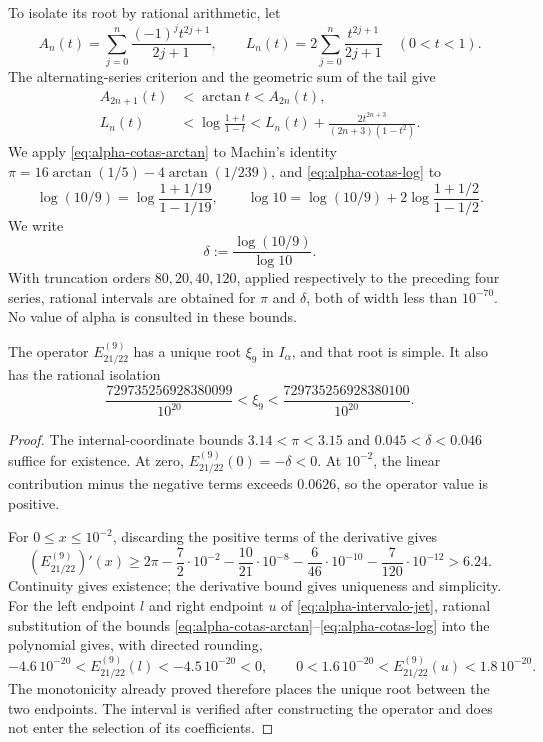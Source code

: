 To isolate its root by rational arithmetic, let
\[
 A_n(t)=\sum_{j=0}^{n}\frac{(-1)^jt^{2j+1}}{2j+1},\qquad
 L_n(t)=2\sum_{j=0}^{n}\frac{t^{2j+1}}{2j+1}\quad(0<t<1).
\]
The alternating-series criterion and the geometric sum of the tail give
\begin{align}
 A_{2n+1}(t)&<\arctan t<A_{2n}(t),
 \label{eq:alpha-cotas-arctan}\\
 L_n(t)&<\log\frac{1+t}{1-t}
 <L_n(t)+\frac{2t^{2n+3}}{(2n+3)(1-t^2)}.
 \label{eq:alpha-cotas-log}
\end{align}
We apply \eqref{eq:alpha-cotas-arctan} to Machin's identity
\(\pi=16\arctan(1/5)-4\arctan(1/239)\), and
\eqref{eq:alpha-cotas-log} to
\[
 \log(10/9)=\log\frac{1+1/19}{1-1/19},\qquad
 \log 10=\log(10/9)+2\log\frac{1+1/2}{1-1/2}.
\]
We write
\[
 \delta:=\frac{\log(10/9)}{\log 10}.
\]
With truncation orders \(80,20,40,120\), applied
respectively to the preceding four series, rational intervals
are obtained for \(\pi\) and \(\delta\), both of width less than
\(10^{-70}\). No value of alpha is consulted in these bounds.

\begin{proposition}
\label{prop:alpha-raiz-jet}
The operator \(E_{21/22}^{(9)}\) has a unique root
\(\xi_9\) in \(I_\alpha\), and that root is simple. It also has the
rational isolation
\begin{equation}
 \frac{729735256928380099}{10^{20}}
 <\xi_9<\frac{729735256928380100}{10^{20}}.
 \label{eq:alpha-intervalo-jet}
\end{equation}
\end{proposition}

\begin{proof}
The internal-coordinate bounds
\(3.14<\pi<3.15\) and
\(0.045<\delta<0.046\) suffice for existence. At zero,
\(E_{21/22}^{(9)}(0)=-\delta<0\). At \(10^{-2}\), the linear
contribution minus the negative terms exceeds \(0.0626\), so the
operator value is positive.

For \(0\leq x\leq10^{-2}\), discarding the positive terms of
the derivative gives
\[
 (E_{21/22}^{(9)})'(x)
 \geq2\pi-\frac72\cdot10^{-2}
 -\frac{10}{21}\cdot10^{-8}-\frac6{46}\cdot10^{-10}
 -\frac7{120}\cdot10^{-12}>6.24.
\]
Continuity gives existence; the derivative bound gives uniqueness and
simplicity. For the left endpoint \(l\) and right endpoint \(u\)
of \eqref{eq:alpha-intervalo-jet}, rational substitution of the bounds
\eqref{eq:alpha-cotas-arctan}--\eqref{eq:alpha-cotas-log} into the polynomial
gives, with directed rounding,
\[
 -4.6\,10^{-20}<E_{21/22}^{(9)}(l)<-4.5\,10^{-20}<0,
 \qquad
 0<1.6\,10^{-20}<E_{21/22}^{(9)}(u)<1.8\,10^{-20}.
\]
The monotonicity already proved therefore places the unique root between
the two endpoints. The interval is verified after constructing the operator
and does not enter the selection of its coefficients.
\end{proof}

